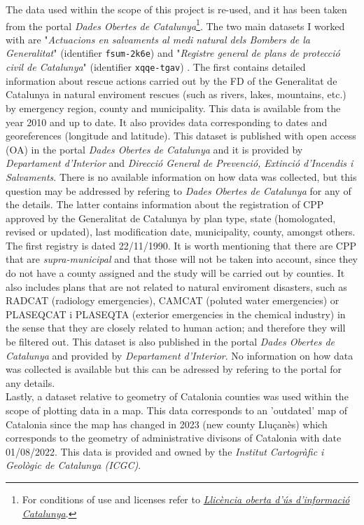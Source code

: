 \documentclass[
  journal=small,
  manuscript=mini-article,  %
  year=2023,
  volume=1,
]{odj-journal}
\begin{document}
The data used within the scope of this project is re-used, and it has been taken from the portal \textit{Dades Obertes de Catalunya}\footnote{For conditions of use and licenses refer to \href{https://governobert.gencat.cat/ca/dades_obertes/llicencia-oberta-informacio-catalunya/}{\textit{Llicència oberta d'ús d'informació Catalunya}}.}\cite{dades_obertes}. The two main datasets I worked with are "\textit{Actuacions en salvaments al medi natural dels Bombers de la Generalitat}" (identifier \texttt{fsum-2k6e})\cite{fd_rescue} and "\textit{Registre general de plans de protecció civil de Catalunya}" (identifier \texttt{xqqe-tgav}) \cite{CPP}. The first contains detailed information about rescue actions carried out by the FD of the Generalitat de Catalunya in natural enviroment rescues (such as rivers, lakes, mountains, etc.) by emergency region, county and municipality. This data is available from the year 2010 and up to date. It also provides data corresponding to dates and georeferences (longitude and latitude). This dataset is published with open access (OA) in the portal \textit{Dades Obertes de Catalunya} and it is provided by \textit{Departament d'Interior} and \textit{Direcció General de Prevenció, Extinció d'Incendis i Salvaments}. There is no available information on how data was collected, but this question may be addressed by refering to \textit{Dades Obertes de Catalunya} for any of the details. The latter contains information about the registration of CPP approved by the Generalitat de Catalunya by plan type, state (homologated, revised or updated), last modification date, municipality, county, amongst others. The first registry is dated 22/11/1990. It is worth mentioning that there are CPP that are \textit{supra-municipal} and that those will not be taken into account, since they do not have a county assigned and the study will be carried out by counties. It also includes plans that are not related to natural enviroment disasters, such as RADCAT (radiology emergencies), CAMCAT (poluted water emergencies) or PLASEQCAT i PLASEQTA (exterior emergencies in the chemical industry) in the sense that they are closely related to human action; and therefore they will be filtered out. This dataset is also published in the portal \textit{Dades Obertes de Catalunya} and provided by \textit{Departament d'Interior}. No information on how data was collected is available but this can be adressed by refering to the portal for any details.\\

Lastly, a dataset relative to geometry of Catalonia counties was used within the scope of plotting data in a map. This data corresponds to an 'outdated' map of Catalonia since the map has changed in 2023 (new county Lluçanès) which corresponds to the geometry of administrative divisons of Catalonia with date 01/08/2022. This data is provided and owned by the \textit{Institut Cartogràfic i Geològic de Catalunya (ICGC)}\cite{geo_dades}. 
\end{document}
